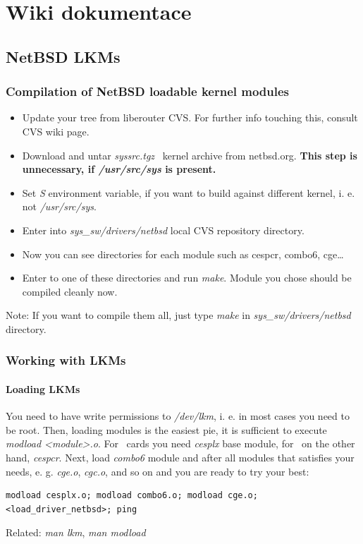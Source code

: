 \appendix
\chapter{Wiki dokumentace}
  \section{NetBSD LKMs}
  \subsection{Compilation of NetBSD loadable kernel modules}
  \begin{itemize}
    \item Update your tree from liberouter CVS. For further info touching this,
      consult CVS wiki page.
    \item Download and untar \emph{syssrc.tgz} \nbsd\ kernel archive from
      net\-bsd.org. \textbf{This step is unnecessary, if \emph{/usr/src/sys} is
      present.}
    \item Set \emph{S} environment variable, if you want to build against
      different kernel, i. e. not \emph{/usr/src/sys}.
    \item Enter into \emph{sys\_sw/drivers/netbsd} local CVS repository
      directory.
    \item Now you can see directories for each module such as cespcr, combo6,
      cge\ldots
    \item Enter to one of these directories and run \emph{make}. Module you
      chose should be compiled cleanly now.
  \end{itemize}
  Note: If you want to compile them all, just type \emph{make} in
  \emph{sys\_sw/dri\-vers/netbsd} directory.
  \subsection{Working with LKMs}
  \subsubsection{Loading LKMs}
  You need to have write permissions to \emph{/dev/lkm}, i. e. in most cases you
  need to be
  root. Then, loading modules is the easiest pie, it is sufficient to execute
  \emph{modload <module>.o}. For \com\ cards you need \emph{cesplx} base
  module, for \comx\ on the other hand, \emph{cespcr}. Next, load \emph{combo6}
  module and after all
  modules that satisfies your needs, e. g. \emph{cge.o}, \emph{cgc.o}, and so
  on and you are ready to try your best:
\begin{verbatim}
modload cesplx.o; modload combo6.o; modload cge.o;
<load_driver_netbsd>; ping
\end{verbatim}
  Related: \emph{man lkm}, \emph{man modload}
